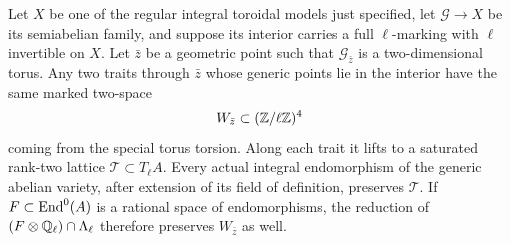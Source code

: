 \begin{lemma}\label{inc:torus}
Let $X$ be one of the regular integral toroidal models just specified,
let $\mathcal G\to X$ be its semiabelian family, and suppose its
interior carries a full $\ell$-marking with $\ell$ invertible on
$X$.  Let $\bar z$ be a geometric point such that
$\mathcal G_{\bar z}$ is a two-dimensional torus.  Any two traits
through $\bar z$ whose generic points lie in the interior have the
same marked two-space
\[
 W_{\bar z}\subset (\mathbb Z/\ell\mathbb Z)^4
\]
coming from the special torus torsion.  Along each trait it lifts to
a saturated rank-two lattice $\mathcal T\subset T_\ell A$.
Every actual integral endomorphism of the generic abelian variety,
after extension of its field of definition, preserves $\mathcal T$.
If $F\subset\operatorname{End}^0(A)$ is a rational space of endomorphisms, the
reduction of $(F\otimes\mathbb Q_\ell)\cap\Lambda_\ell$ therefore
preserves $W_{\bar z}$ as well.
\end{lemma}

